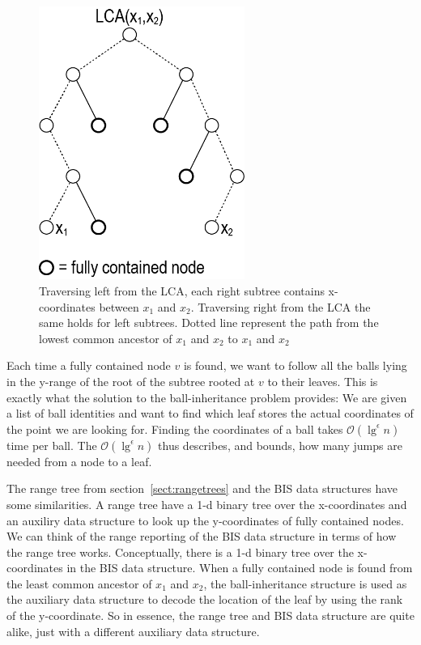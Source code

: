 \begin{figure}[h]
    \centering
    \includegraphics[width=0.6\textwidth]{pictures/LCA2.png}
    \caption{Traversing left from the LCA, each right subtree contains x-coordinates between $x_1$ and $x_2$. Traversing right from the LCA the same holds for left subtrees. Dotted line represent the path from the lowest common ancestor of $x_1$ and $x_2$ to $x_1$ and $x_2$}
    \label{fig:LCA}
\end{figure}
\clearpage


Each time a fully contained node $v$ is found, we want to follow all the balls lying in the y-range of the root of the subtree rooted at $v$ to their leaves. This is exactly what the solution to the ball-inheritance problem provides: We are given a list of ball identities and want to find which leaf stores the actual coordinates of the point we are looking for. Finding the coordinates of a ball takes $\mathcal{O}(\lg^\epsilon n)$ time per ball. The $\mathcal{O}(\lg^\epsilon n)$ thus describes, and bounds, how many jumps are needed from a node to a leaf.


The range tree from section~\ref{sect:rangetrees} and the BIS data structures have some similarities. A range tree have a 1-d binary tree over the x-coordinates and an auxiliry data structure to look up the y-coordinates of fully contained nodes. We can think of the range reporting of the BIS data structure in terms of how the range tree works. Conceptually, there is a 1-d binary tree over the x-coordinates in the BIS data structure. When a fully contained node is found from the least common ancestor of $x_1$ and $x_2$, the ball-inheritance structure is used as the auxiliary data structure to decode the location of the leaf by using the rank of the y-coordinate. So in essence, the range tree and BIS data structure are quite alike, just with a different auxiliary data structure. 

